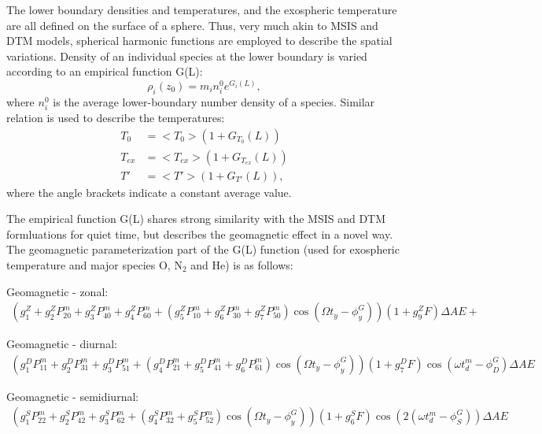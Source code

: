 \documentclass[referee,a4paper,12pt,traditabstract]{swsc}
\begin{document}
\begin{linenumbers}
The lower boundary densities and temperatures, and the exospheric temperature are all defined on the surface of a sphere. Thus, very much akin to MSIS and DTM models, spherical harmonic functions are employed to describe the spatial variations. Density of an individual species at the lower boundary is varied according to an empirical function G(L):
\begin{equation}
\rho_i(z_0) = m_in^0_i e^{G_i(L)},
\end{equation}
where $n_i^0$ is the average lower-boundary number density of a species. Similar relation is used to describe the temperatures:
\begin{align}
T_0 &= <T_0>(1+G_{T_0}(L)) \\
T_{ex} &= <T_{ex}>(1+G_{T_{ex}}(L))\\
T' &= <T'>(1+G_{T'}(L)),
\end{align}
where the angle brackets indicate a constant average value. 

The empirical function G(L) shares strong similarity with the MSIS and DTM formluations for quiet time, but describes the geomagnetic effect in a novel way. The geomagnetic parameterization part of the G(L) function (used for exospheric temperature and major species O, $\mathrm{N_{2}}$ and He) is as follows:

Geomagnetic - zonal:
\begin{align*}
(g^Z_1+g^Z_2 P^m_{20}+g^Z_3 P^m_{40}+g^Z_4 P^m_{60} + (g^Z_5 P^m_{10}+g^Z_6 P^m_{30}+g^Z_7 P^m_{50})    \cos(\Omega t_y-\phi^G_y))(1+g^Z_9 F)\Delta AE +
\end{align*}

Geomagnetic - diurnal:
\begin{align*}
(g^D_1 P^m_{11}+g^D_2 P^m_{31}+g^D_3 P^m_{51} + (g^D_4 P^m_{21}+g^D_5 P^m_{41}+g^D_6 P^m_{61})    \cos(\Omega t_y-\phi^G_y))(1+g^D_7 F)\cos(\omega t^m_d-\phi^G_D)\Delta AE
\end{align*}

Geomagnetic - semidiurnal:
\begin{align*}
(g^S_1 P^m_{22}+g^S_2 P^m_{42}+g^S_3 P^m_{62} + (g^S_4 P^m_{32}+g^S_5 P^m_{52})\cos(\Omega t_y-\phi^G_y))(1+g^S_6 F)\cos(2(\omega t^m_d-\phi^G_S))\Delta AE
\end{align*}


\end{linenumbers}
\end{document}

